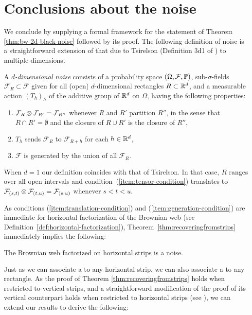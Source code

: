 {
\section{Conclusions about the noise}
\label{sec:conclusions-about-the-noise}

We conclude by supplying a formal framework for the statement of
Theorem \ref{thm:bw-2d-black-noise} followed by its proof.
The following definition of noise is a straightforward extension of
that due to Tsirelson (Definition
3d1 of \cite{tsirelson-nonclassical-stochastic-flows})
to multiple dimensions.

\newcommand{\F}{\mathcal{F}}
A \emph{$d$-dimensional noise} consists of a probability space $(\Omega,\F,
\P)$, sub-$\sigma$-fields $\F_R \subset \F$ given for all (open)
$d$-dimensional rectangles $R \subset \mathbb{R}^d$, and a measurable action
$(T_h)_h$ of the additive group of $\mathbb{R}^d$ on $\Omega$, having the following properties:

\begin{enumerate}
\item \label{item:tensor-condition} $\F_R \tensor \F_{R'} = \F_{R''}$ whenever
$R$ and $R'$ partition $R''$, in the sense that
$R\cap R'=\emptyset$ and the closure of $R \cup R'$
is the closure of $R''$,
\item \label{item:translation-condition} $T_h$ sends $\F_R$ to $\F_{R+h}$ for each $h \in \mathbb{R}^d$,
\item \label{item:generation-condition} $\F$ is generated by the union of all $\F_R$.
\end{enumerate}

When $d = 1$ our definition coincides with that of Tsirelson.
In that case, $R$ ranges over all open intervals
and condition~(\ref{item:tensor-condition}) translates to
$\F_{(s,t)} \tensor \F_{(t,u)} = \F_{(s,u)}$ whenever $s < t < u$.


As conditions (\ref{item:translation-condition}) and
(\ref{item:generation-condition}) are immediate for
horizontal factorization of the Brownian web (see
Definition~\ref{def:horizontal-factorization}),
Theorem~\ref{thm:recoveringfromstrips} immediately
implies the following:

\begin{proposition*}
The Brownian web factorized on horizontal strips is a noise.
\end{proposition*}

Just as we can associate a \sigfield{} to any horizontal strip, we can
also associate a \sigfield{} to any rectangle.
As the proof of Theorem \ref{thm:recoveringfromstrips}
holds when restricted to vertical strips, and a straightforward
modification of the proof of its vertical
counterpart holds when restricted to horizontal strips
(see \cite{tsirelson-scaling-limit-noise-stability}),
we can extend our results to derive the following:

}
